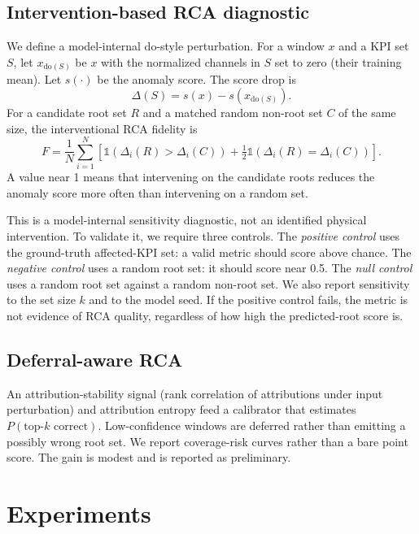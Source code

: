 \documentclass[conference]{IEEEtran}
\begin{document}
\subsection{Intervention-based RCA diagnostic}

We define a model-internal do-style perturbation. For a window $x$ and a KPI set $S$, let $x_{\mathrm{do}(S)}$ be $x$ with the normalized channels in $S$ set to zero (their training mean). Let $s(\cdot)$ be the anomaly score. The score drop is
\begin{equation}
\Delta(S) = s(x) - s(x_{\mathrm{do}(S)}).
\end{equation}
For a candidate root set $R$ and a matched random non-root set $C$ of the same size, the interventional RCA fidelity is
\begin{equation}
F = \frac{1}{N}\sum_{i=1}^{N}\left[\mathbb{1}(\Delta_i(R)>\Delta_i(C)) + \tfrac{1}{2}\mathbb{1}(\Delta_i(R)=\Delta_i(C))\right].
\end{equation}
A value near 1 means that intervening on the candidate roots reduces the anomaly score more often than intervening on a random set.

This is a model-internal sensitivity diagnostic, not an identified physical intervention. To validate it, we require three controls. The \emph{positive control} uses the ground-truth affected-KPI set: a valid metric should score above chance. The \emph{negative control} uses a random root set: it should score near 0.5. The \emph{null control} uses a random root set against a random non-root set. We also report sensitivity to the set size $k$ and to the model seed. If the positive control fails, the metric is not evidence of RCA quality, regardless of how high the predicted-root score is.

\subsection{Deferral-aware RCA}

An attribution-stability signal (rank correlation of attributions under input perturbation) and attribution entropy feed a calibrator that estimates $P(\text{top-}k\text{ correct})$. Low-confidence windows are deferred rather than emitting a possibly wrong root set. We report coverage-risk curves rather than a bare point score. The gain is modest and is reported as preliminary.

\section{Experiments}
\end{document}
